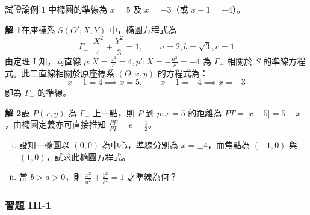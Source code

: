 \begin{example}
試證論例 1 中橢圓的準線為 $x=5$ 及 $x=-3$（或 $x-1 = \pm 4$）。

\textbf{解 1}\quad 在座標系 $S(O'; X, Y)$ 中，橢圓方程式為
\[ \Gamma_- : \frac{X^2}{4} + \frac{Y^2}{3} = 1, \qquad a=2, b=\sqrt{3}, c=1 \]
由定理 I 知，兩直線 $p: X = \frac{a^2}{c} = 4, p': X = -\frac{a^2}{c} = -4$ 為 $\Gamma_-$ 相關於 $S$ 的準線方程式。此二直線相關於原座標系 $(O; x, y)$ 的方程式為：
\[ x-1 = 4 \implies x = 5, \qquad x-1 = -4 \implies x = -3 \]
卽為 $\Gamma_-$ 的準線。

\textbf{解 2}\quad 設 $P(x,y)$ 為 $\Gamma_-$ 上一點，則 $P$ 到 $p: x = 5$ 的距離為 $PT = |x - 5| = 5 - x$，由橢圓定義亦可直接推知 $\frac{PF}{PT} = e = \frac{1}{2}$。
\end{example}

\begin{exercise}
\begin{enumerate}[(i)]
  \item 設知一橢圓以 $(0,0)$ 為中心，準線分別為 $x = \pm 4$，而焦點為 $(-1,0)$ 與 $(1,0)$，試求此橢圓方程式。
  \item 當 $b > a > 0$，則 $\frac{x^2}{a^2} + \frac{y^2}{b^2} = 1$ 之準線為何？
\end{enumerate}
\end{exercise}

\subsubsection*{習題 III-1}


